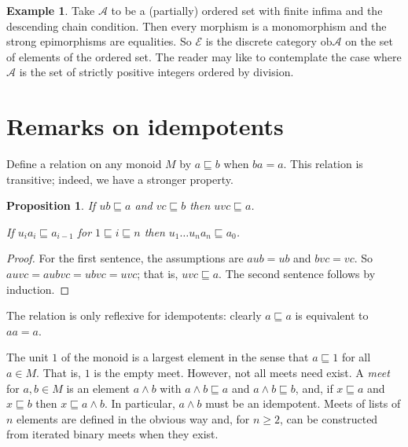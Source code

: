 \documentclass[a4paper,12pt,reqno]{amsart}
\newtheorem{proposition}[theorem]{Proposition}
\theoremstyle{definition}
\newtheorem{example}[theorem]{Example}
\theoremstyle{fact}
\theoremstyle{genquest}
\theoremstyle{step}
\def\CA{{\mathscr A}}
\def\CE{{\mathscr E}}
\begin{document}
\begin{example}
Take $\CA$ to be a (partially) ordered set with finite infima and the descending chain condition. 
Then every morphism is a monomorphism
and the strong epimorphisms are equalities. So $\CE$ is
the discrete category $\mathrm{ob}\CA$ on the set of
elements of the ordered set. The reader may like to contemplate
the case where $\CA$ is the set of strictly positive integers
ordered by division. 
\end{example}

\section{Remarks on idempotents}\label{idemp}

Define a relation on any monoid $M$ by $a\sqsubseteq b$ when $ba = a$.
This relation is transitive; indeed, we have a stronger property.

\begin{proposition}\label{gentrans}
If $ub\sqsubseteq a$ and $vc \sqsubseteq b$ then $uvc\sqsubseteq a$.

If $u_ia_i\sqsubseteq a_{i-1}$ for $1\sqsubseteq i\sqsubseteq n$ then $u_1\dots u_na_n\sqsubseteq a_0$.
\end{proposition}
\begin{proof}
For the first sentence, the assumptions are $aub = ub$ and $bvc=vc$.
So $auvc = aubvc=ubvc=uvc$; that is, $uvc \sqsubseteq a$. 
The second sentence follows by induction.
\end{proof}

The relation is only reflexive for idempotents: clearly $a\sqsubseteq a$ is equivalent to $aa=a$.

The unit $1$ of the monoid is a largest element in the sense that $a\sqsubseteq 1$ for all $a\in M$.
That is, $1$ is the empty meet. 
However, not all meets need exist. A {\em meet} for $a,b\in M$ is an element $a\wedge b$
with $a\wedge b \sqsubseteq a$ and $a\wedge b \sqsubseteq b$, and, if $x\sqsubseteq a$ and $x\sqsubseteq b$ then
$x\sqsubseteq a\wedge b$. In particular, $a\wedge b$ must be an idempotent. 
Meets of lists of $n$ elements are defined in the obvious way and, for $n\ge 2$,
can be constructed from iterated binary meets when they exist. 
\end{document}
